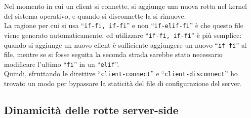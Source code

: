 Nel momento in cui un client si connette, si aggiunge una nuova rotta nel kernel
del sistema operativo, e quando si disconnette la si rimuove.\\
La ragione per cui si usa ``\texttt{if-fi, if-fi}'' e non ``\texttt{if-elif-fi}''
è che questo file viene generato automaticamente, ed utilizzare ``\texttt{if-fi, if-fi}''
è più semplice: quando si aggiunge un nuovo client è sufficiente aggiungere un
nuovo ``\texttt{if-fi}'' al file, mentre se si fosse seguita la seconda strada
sarebbe stato necessario modificare l'ultimo ``\texttt{fi}'' in un ``\texttt{elif}''.\\
Quindi, sfruttando le direttive ``\texttt{client-connect}'' e ``\texttt{client-disconnect}''
ho trovato un modo per bypassare la staticità del file di configurazione del server.\\



\subsection{Dinamicità delle rotte server-side}
